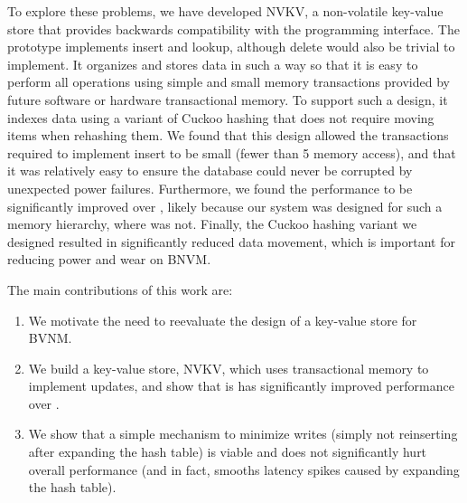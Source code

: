 To explore these problems, we have developed NVKV, a non-volatile key-value
store that provides backwards compatibility with the \bdb programming interface.
The prototype implements insert and lookup, although delete would also be trivial
to implement. It organizes and stores data in such a way so that it is easy to
perform all operations using simple and small memory transactions provided by
future software or hardware transactional memory. To support such a design, it
indexes data using a variant of Cuckoo hashing that does not require moving
items when rehashing them. We found that this design allowed the transactions
required to implement insert to be small (fewer than 5 memory access), and that
it was relatively easy to ensure the database could never be corrupted by
unexpected power failures. Furthermore, we found the performance to be
significantly improved over \bdb, likely because our system was designed for
such a memory hierarchy, where \bdb was not. Finally, the Cuckoo hashing variant
we designed resulted in significantly reduced data movement, which is important
for reducing power and wear on BNVM.

The main contributions of this work are:

\begin{enumerate}

\item We motivate the need to reevaluate the design of a key-value store for
BVNM.
\item We build a key-value store, NVKV, which uses transactional
memory to implement updates, and show that is has significantly improved
performance over \bdb.
\item We show that a simple mechanism to minimize writes (simply not reinserting
after expanding the hash table) is viable and does not significantly hurt
overall performance (and in fact, smooths latency spikes caused by expanding the
hash table).
\end{enumerate}

